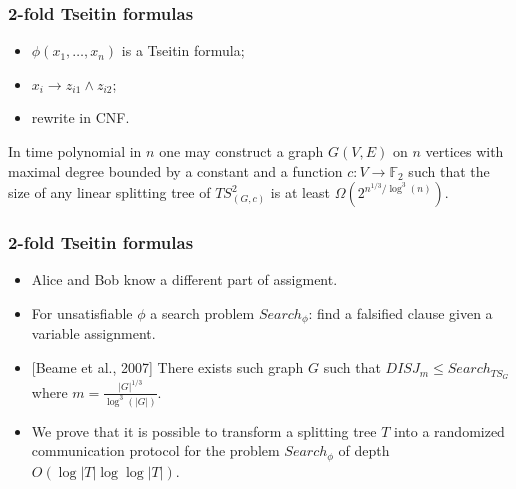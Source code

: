 \begin{frame}
    \frametitle{2-fold Tseitin formulas}

    \begin{itemize}
        \item $\phi(x_1, \dots, x_n)$ is a Tseitin formula;
        \item $x_i \to z_{i1} \land z_{i2}$;
    	\item rewrite in CNF.
	\end{itemize}

	\pause
    \begin{theorem}
        In time polynomial in $n$ one may construct a graph $G(V, E)$ on $n$ vertices with maximal degree bounded by a
        constant and a function $c: V \to \mathbb{F}_2$ such that the size of any linear splitting tree of
        $TS^2_{(G,c)}$ is at least $\Omega\left(2^{n^{1 / 3} / \log^3(n)} \right)$.
    \end{theorem}
\end{frame}

\begin{frame}
    \frametitle{2-fold Tseitin formulas}
    
    \begin{itemize}
        \item Alice and Bob know a different part of assigment.
		\item For unsatisfiable $\phi$ a search problem $Search_\phi$: find a
		    falsified clause given a variable assignment.
        \pause
        \item{} [Beame et al., 2007] There exists such graph $G$ such that $DISJ_{m} \le Search_{TS_{G}}$ where $m =
			\frac{|G|^{1 / 3}}{\log^3(|G|)}$.
		\item We prove that it is possible to transform a splitting tree $T$ into a
		    randomized communication protocol for the problem $Search_\phi$ of depth
	        $O(\log |T| \log\log |T|)$.
        \pause
	\end{itemize}
\end{frame}




